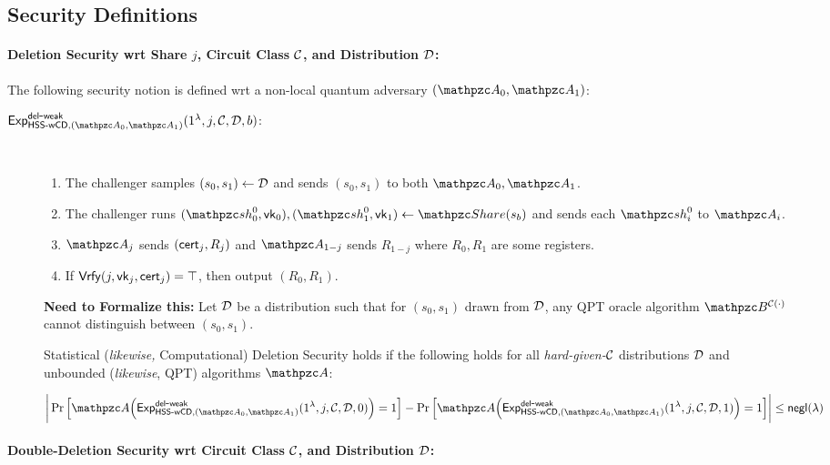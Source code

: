 \subsection{Security Definitions}

\paragraph{Deletion Security wrt Share
$j$, Circuit Class $\mathcal{C}$, and Distribution $\mathcal{D}$:}
The following security notion is defined wrt a non-local quantum
adversary $(\qA_0, \qA_1)$:

\begin{description}
\item [$\expb{\HSSwcd, (\qA_0, \qA_1)}{del}{weak}(1^\secp, j, \calC,
\calD, b)$:] $ $
\begin{enumerate}
\item The challenger samples $(s_0, s_1) \leftarrow \mathcal{D}$ and
sends $(s_0, s_1)$ to both $\qA_0, \qA_1$.
\item 
The challenger runs
$(\qsh_0^0, \vk_0), (\qsh_1^0, \vk_1) \gets \Sh(s_b)$ and sends each
$\qsh_i^0$ to $\qA_i$.

\item $\qA_j$ sends $(\mathsf{cert}_j, R_j)$ and $\qA_{1-j}$ sends $R_{1-j}$
where $R_0, R_1$ are some registers.
\item If $\mathsf{Vrfy}(j, \mathsf{vk}_j, \mathsf{cert}_j) = \top$, then output $(R_0,
R_1)$.
\end{enumerate}

\textbf{Need to Formalize this:} Let $\mathcal{D}$ be a distribution such
that for $(s_0, s_1)$ drawn from $\mathcal{D}$, any QPT oracle algorithm
$\qB^{\calC(\cdot)}$ cannot distinguish between $(s_0, s_1)$.

Statistical (\emph{likewise,} Computational) Deletion Security holds
if the
following holds for all \emph{hard-given-$\mathcal{C}$} distributions
$\mathcal{D}$ and unbounded (\emph{likewise}, QPT) algorithms $\qA$:

$$\bigg\lvert \Pr\Big[\qA\Big(\expb{\HSSwcd, (\qA_0,
\qA_1)}{del}{weak}(1^\secp, j, \calC, \calD, 0)\Big)=1\Big] -
\Pr\Big[\qA\Big(\expb{\HSSwcd, (\qA_0,
\qA_1)}{del}{weak}(1^\secp, j, \calC, \calD, 1)\Big)=1\Big]
\bigg\rvert \le \negl(\secp)$$
\end{description}

\paragraph{Double-Deletion Security wrt Circuit Class $\mathcal{C}$, and
Distribution $\mathcal{D}$:}

